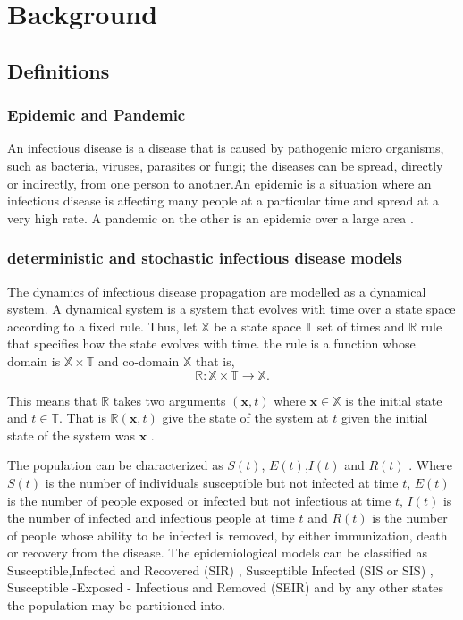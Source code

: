 \chapter{Background}

\section{Definitions}
\subsection{Epidemic and Pandemic }
An infectious disease is a disease that is caused by pathogenic micro organisms, such as bacteria, viruses, parasites or fungi; the diseases can be spread, directly or indirectly, from one person to another.An  epidemic is a situation where an infectious disease is affecting many people at a particular time and spread at a very high rate. A pandemic on the other is an epidemic over a large area \citep{morens2009pandemic}.

\subsection{deterministic and stochastic infectious disease models}
The dynamics of infectious disease propagation are modelled as a dynamical system. A dynamical system is a system that evolves with time over a state space according to a fixed rule. Thus, let $\mathbb{X}$ be a state space $\mathbb{T}$ set of times and $\mathbb{R}$ rule that specifies how the state evolves with time. the rule is a function  whose domain is $\mathbb{X} \times  \mathbb{T}$ and co-domain $\mathbb{X}$ that is,
\begin{equation*}
\mathbb{R}: \mathbb{X}  \times \mathbb{T} \longrightarrow \mathbb{X}.
\end{equation*}

This means that $\mathbb{R}$ takes two arguments $( \textbf{x},t)$ where $\textbf{x} \in \mathbb{X}$ is the initial state and $t \in \mathbb{T}$. That is $\mathbb{R} ( \textbf{x},t)$ give the state of the system at $t$ given the initial state of the system was $\textbf{x}$ \citep{DQ}.

The population can be characterized as $S(t)$, $E(t)$,$I(t)$ and $R(t)$ . Where $S(t)$ is the number of individuals susceptible but not infected at time $t$, $E(t)$ is the number of people exposed or infected but not infectious at time $t$, $I(t)$ is the number of infected and infectious people at time $t$ and $R(t)$ is the number of people whose  ability to be infected is removed, by either immunization, death or recovery from the disease. The epidemiological models can be classified as Susceptible,Infected and Recovered (SIR) , Susceptible Infected (SIS or SIS) , Susceptible -Exposed - Infectious and Removed (SEIR)  and by any other states the population may be partitioned into.

